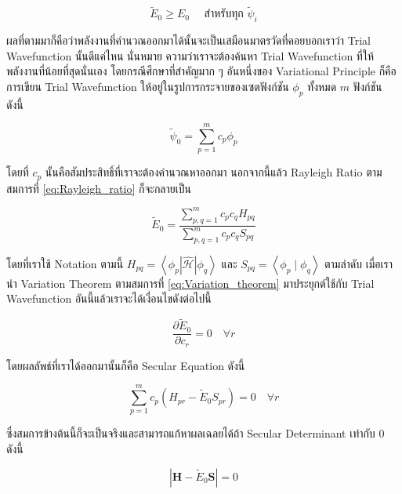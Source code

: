 \begin{equation}
    \label{eq:Variation_theorem}
    \tilde{E}_0 \geq E_0 \quad \text{ สำหรับทุก } \tilde{\psi}_i
\end{equation}

\noindent ผลที่ตามมาก็คือว่าพลังงานที่คำนวณออกมาได้นั้นจะเป็นเสมือนมาตรวัดที่คอยบอกเราว่า Trial Wavefunction นั้นดีแค่ไหน นั่นหมาย%
ความว่าเราจะต้องค้นหา Trial Wavefunction ที่ให้พลังงานที่น้อยที่สุดนั่นเอง โดยกรณีศึกษาที่สำคัญมาก ๆ อันหนึ่งของ Variational Principle
ก็คือการเขียน Trial Wavefunction ให้อยู่ในรูปการกระจายของเซตฟังก์ชัน $\phi_p$ ทั้งหมด $m$ ฟังก์ชัน ดังนี้

\begin{equation}
    \tilde{\psi}_0 = \sum_{p=1}^m c_p \phi_p
\end{equation}

\noindent โดยที่ $c_p$ นั้นคือสัมประสิทธิ์ที่เราจะต้องคำนวณหาออกมา นอกจากนี้แล้ว Rayleigh Ratio ตามสมการที่ \ref{eq:Rayleigh_ratio}
ก็จะกลายเป็น

\begin{equation}
    \tilde{E}_0
    =
    \frac
    {
        \sum_{p, q=1}^m c_p c_q H_{p q}
    }
    {
        \sum_{p, q=1}^m c_p c_q S_{p q}
    }
\end{equation}

\noindent โดยที่เราใช้ Notation ตามนี้ $H_{p q}=\left\langle\phi_p|\hat{\mathscr{H}}| \phi_q\right\rangle$ และ
$S_{p q}=\left\langle\phi_p \mid \phi_q\right\rangle$ ตามลำดับ เมื่อเรานำ Variation Theorem ตามสมการที่
\ref{eq:Variation_theorem} มาประยุกต์ใช้กับ Trial Wavefunction อันนี้แล้วเราจะได้เงื่อนไขดังต่อไปนี้

\begin{equation}
    \frac
    {
        \partial \tilde{E}_0
    }
    {
        \partial c_r
    }
    =
    0 \quad \forall r
\end{equation}

\noindent โดยผลลัพธ์ที่เราได้ออกมานั้นก็คือ Secular Equation ดังนี้

\begin{equation}
    \sum_{p=1}^{m} c_{p} \left( H_{pr} - \tilde{E}_{0} S_{pr} \right)
    =
    0 \quad \forall r
\end{equation}

\noindent ซึ่งสมการข้างต้นนี้ก็จะเป็นจริงและสามารถแก้หาผลเฉลยได้ถ้า Secular Determinant เท่ากับ 0 ดังนี้

\begin{equation}
    |\boldsymbol{H} - \tilde{E}_{0} \boldsymbol{S}| = 0
\end{equation}

